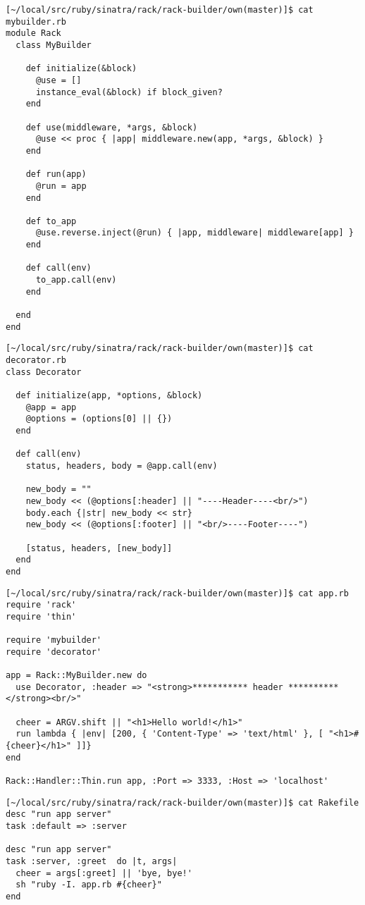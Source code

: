 \begin{verbatim}
[~/local/src/ruby/sinatra/rack/rack-builder/own(master)]$ cat mybuilder.rb 
module Rack
  class MyBuilder

    def initialize(&block)
      @use = []
      instance_eval(&block) if block_given?
    end

    def use(middleware, *args, &block)
      @use << proc { |app| middleware.new(app, *args, &block) }
    end

    def run(app)
      @run = app
    end

    def to_app
      @use.reverse.inject(@run) { |app, middleware| middleware[app] }
    end

    def call(env)
      to_app.call(env)
    end

  end
end
\end{verbatim}

\begin{verbatim}
[~/local/src/ruby/sinatra/rack/rack-builder/own(master)]$ cat decorator.rb 
class Decorator

  def initialize(app, *options, &block)
    @app = app
    @options = (options[0] || {})
  end

  def call(env)
    status, headers, body = @app.call(env)

    new_body = ""
    new_body << (@options[:header] || "----Header----<br/>")
    body.each {|str| new_body << str}
    new_body << (@options[:footer] || "<br/>----Footer----")

    [status, headers, [new_body]]
  end
end
\end{verbatim}

\begin{verbatim}
[~/local/src/ruby/sinatra/rack/rack-builder/own(master)]$ cat app.rb 
require 'rack'
require 'thin'

require 'mybuilder'
require 'decorator'

app = Rack::MyBuilder.new do
  use Decorator, :header => "<strong>*********** header **********</strong><br/>"

  cheer = ARGV.shift || "<h1>Hello world!</h1>"
  run lambda { |env| [200, { 'Content-Type' => 'text/html' }, [ "<h1>#{cheer}</h1>" ]]}
end

Rack::Handler::Thin.run app, :Port => 3333, :Host => 'localhost'
\end{verbatim}

\begin{verbatim}
[~/local/src/ruby/sinatra/rack/rack-builder/own(master)]$ cat Rakefile 
desc "run app server"
task :default => :server

desc "run app server"
task :server, :greet  do |t, args|
  cheer = args[:greet] || 'bye, bye!'
  sh "ruby -I. app.rb #{cheer}"
end
\end{verbatim}

